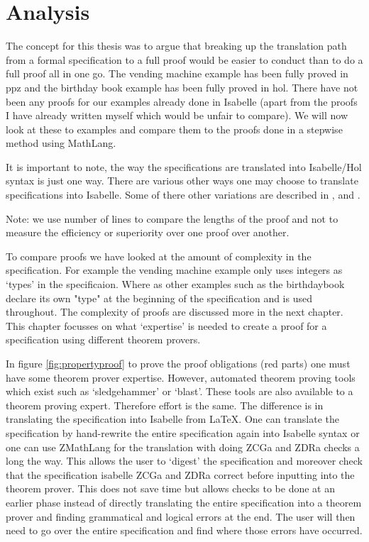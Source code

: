 \chapter{Analysis}
\label{ch:analysis}

The concept for this thesis was to argue that breaking up the translation path
from a formal specification to a full proof would be easier to conduct than to
do a full proof all in one go. The vending machine example has been fully proved
in \gls{ppz} and the birthday book example has been fully proved in \gls{hol}.
There have not been any proofs for our examples already done in Isabelle (apart
from the proofs I have already written myself which would be unfair to compare).
We will now look at these to examples and compare them to the proofs done in a
stepwise method using MathLang.

It is important to note, the way the specifications are translated into
Isabelle/Hol syntax is just one way. There are various other ways one may choose
to translate specifications into Isabelle. Some of there other variations are
described in \cite{Kolyang1996}, \cite{Kolyang86towardsa} and \cite{hol-z}.

Note: we use number of lines to compare the lengths of the proof and not
to measure the efficiency  or superiority over one proof over another.

To compare proofs we have looked at the amount of complexity in the specification.
For example the vending machine example only uses integers as `types' in the specificaion.
Where as other examples such as the birthdaybook declare its own "type" at the beginning
of the specification and is used throughout. The complexity of proofs are discussed more in the
next chapter.
This chapter focusses on what `expertise' is needed to create a proof for a specification
using different theorem provers.

In figure \ref{fig:propertyproof} to prove the proof obligations (red parts) one must have some
theorem prover expertise. However, automated theorem proving tools which exist such as 
`sledgehammer' or `blast'. These tools are also available to a theorem proving expert. Therefore
effort is the same.
The difference is in translating the specification into Isabelle from \LaTeX. One can 
translate the specification by hand-rewrite the entire specification again into Isabelle syntax
or one can use ZMathLang for the translation with doing ZCGa and ZDRa checks a long the way.
This allows the user to `digest' the specification and moreover check that the specification isabelle
ZCGa and ZDRa correct before inputting into the theorem prover. This does not save time but 
allows checks to be done at an earlier phase instead of directly translating the entire specification
into a theorem prover and finding grammatical and logical errors at the end. The user will then
need to go over the entire specification and find where those errors have occurred.

